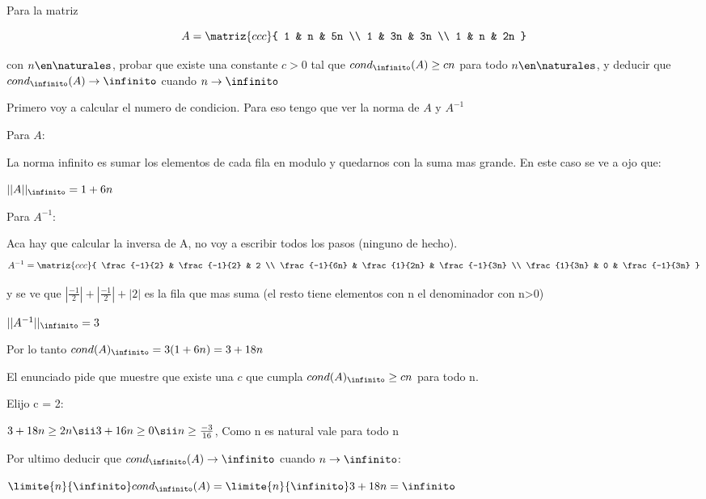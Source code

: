 \begin{enunciado}{\ejercicio}
Para la matriz

$$
A =
\matriz{ccc}{
  1 & n & 5n \\
  1 & 3n & 3n \\
  1 & n & 2n
}$$

con $n \en \naturales$, probar que existe una constante $c > 0$ tal que $cond_\infinito(A) \geq cn$ para todo $n \en \naturales$,
y deducir que $cond_\infinito(A) \rightarrow \infinito$ cuando $n \rightarrow \infinito$
\end{enunciado}

\medskip

Primero voy a calcular el numero de condicion. Para eso tengo que ver la norma de $A$ y $A^{-1}$

Para $A$:

La norma infinito es sumar los elementos de cada fila en modulo y quedarnos con la suma mas grande.
En este caso se ve a ojo que:

$||A||_\infinito = 1 + 6n$

Para $A^{-1}$:

Aca hay que calcular la inversa de A, no voy a escribir todos los pasos (ninguno de hecho).
$$
A^{-1} =
\matriz{ccc}{
  \frac{-1}{2} & \frac{-1}{2} & 2 \\ 
  \frac{-1}{6n} & \frac{1}{2n} & \frac{-1}{3n} \\
  \frac{1}{3n} & 0 & \frac{-1}{3n}
}$$

y se ve que $|\frac{-1}{2}| + |\frac{-1}{2}| + |2|$ es la fila que mas suma 
(el resto tiene elementos con n el denominador con n>0)

$||A^{-1}||_\infinito = 3$

Por lo tanto $cond(A)_\infinito = 3(1+6n) = 3+18n$

El enunciado pide que muestre que existe una $c$ que cumpla $cond(A)_\infinito \geq cn$ para todo n.

Elijo c = 2:

$
3+18n \geq 2n \sii 3 + 16n \geq 0 \sii n \geq \frac{-3}{16}
$, Como n es natural vale para todo n

Por ultimo deducir que $cond_\infinito(A) \rightarrow \infinito$ cuando $n \rightarrow \infinito$:

$\limite{n}{\infinito}cond_\infinito(A) = \limite{n}{\infinito} 3+18n = \infinito$

\begin{aportes}
    \item {}
\end{aportes}